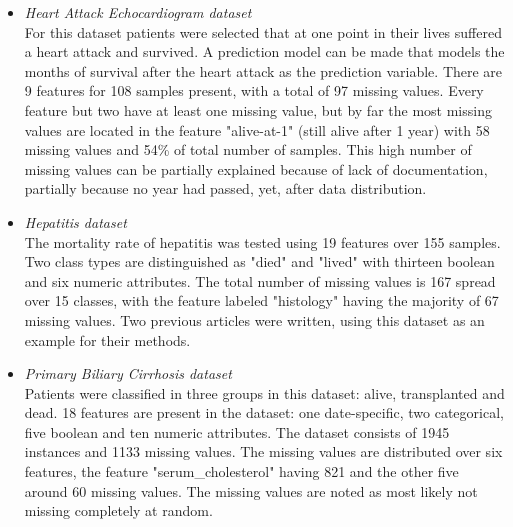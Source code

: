 \documentclass[10pt,a4paper]{article}
\begin{document}
	\begin{itemize}
		\item \textit{Heart Attack Echocardiogram dataset} \\ For this dataset patients were selected that at one point in their lives suffered a heart attack and survived. A prediction model can be made that models the months of survival after the heart attack as the prediction variable. There are 9 features for 108 samples present, with a total of 97 missing values. Every feature but two have at least one missing value, but by far the most missing values are located in the feature "alive-at-1" (still alive after 1 year) with 58 missing values and 54\% of total number of samples. This high number of missing values can be partially explained because of lack of documentation, partially because no year had passed, yet, after data distribution\cite{kan1986short}. %
		\item \textit{Hepatitis dataset} \\ The mortality rate of hepatitis was tested using 19 features over 155 samples. Two class types are distinguished as "died" and "lived" with thirteen boolean and six numeric attributes. The total number of missing values is 167 spread over 15 classes, with the feature labeled "histology" having the majority of 67 missing values. Two previous articles were written, using this dataset as an example for their methods\cite{diaconis1983computer, cestnikkononenkoj}.
		\item \textit{Primary Biliary Cirrhosis dataset} \\ Patients were classified in three groups in this dataset: alive, transplanted and dead. 18 features are present in the dataset: one date-specific, two categorical, five boolean and ten numeric attributes. The dataset consists of 1945 instances and 1133 missing values. The missing values are distributed over six features, the feature "serum\_cholesterol" having 821 and the other five around 60 missing values. The missing values are noted as most likely not missing completely at random\cite{murtaugh1994primary}. %

\end{itemize}
\end{document}
